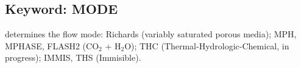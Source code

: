 \hyperlink{target_key}{\return}


\begin{comment}
\newpage
\protect\hypertarget{target_max}{}

\subsection{Keyword: MAX\_CHANGE}

\noindent{\bf Description:}

\noindent{\bf Input:}
\begin{deflist}{000}
\item[MAX\_CHANGE] \ {\tt DPMAX} \ {\tt DTMAX} \ {\tt DSMAX} \ {\tt DCMAX}
\end{deflist}

\noindent{\bf Explanation:}

\begin{mdframed}

\noindent{\bf Example:}
\begin{verbatim}
:          dpmax dtmax dsmax dcmax
:geh - this is bogus!
MAX_CHANGE 5.d4    5.  0.02   0.05
/
/
\end{verbatim}
\end{mdframed}

\hyperlink{target_key}{\return}
\end{comment}


\newpage
\protect\hypertarget{target_mode}{}

\subsection{Keyword: MODE}

 determines the flow mode: Richards (variably saturated porous media); MPH, \linebreak MPHASE, FLASH2 (CO$_2$ + H$_2$O); THC (Thermal-Hydrologic-Chemical, in pro\-gress); IMMIS, THS (Immisible).

\begin{comment}
\noindent{\bf Input:}
\begin{deflist}{000}
\item[MODE] <option>
\item[Options:] ~
\begin{deflist}{000}
\item[RICHARDS]
\item[MPHASE (MPH)]
\item[FLASH2]
\item[THC (\rm in progress)]
\item[IMMIS (IMS, THS)]
\end{deflist}
\end{deflist}
\end{comment}

